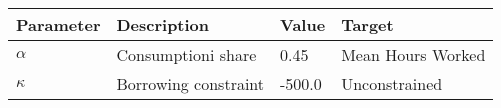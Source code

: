 \begin{tabular}{l l l l} 
\hline 
Parameter & Description & Value & Target \\ 
\hline 
$\alpha$ & Consumptioni share & 0.45 & Mean Hours Worked \\ 
$\kappa$ & Borrowing constraint & -500.0 & Unconstrained \\ 
\hline 
\end{tabular}
